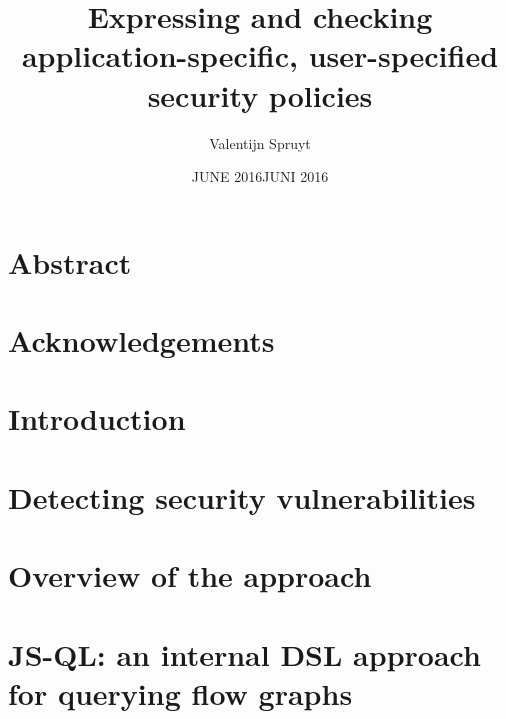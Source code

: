 \documentclass[a4paper, 12pt]{report}
\author{Valentijn Spruyt}
\title{Expressing and checking application-specific, user-specified security policies}
\date{JUNE 2016}
\begin{document}
\maketitlepage
 
 
\date{JUNI 2016}
 
\maketitlepage


\chapter*{Abstract}
 
 
 
\chapter*{Acknowledgements}
 
\tableofcontents



\chapter{Introduction}


\chapter{Detecting security vulnerabilities}

 
\chapter{Overview of the approach}
\label{ch:Overview}


\chapter{JS-QL: an internal DSL approach for querying flow graphs}
\label{ch:JSQL}

 
\end{document}
